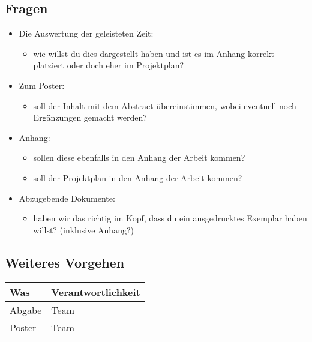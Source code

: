 \subsection*{Fragen}
\begin{itemize}
    \item Die Auswertung der geleisteten Zeit:
    \begin{itemize}
        \item wie willst du dies dargestellt haben und ist es im Anhang korrekt platziert oder doch eher im Projektplan?
    \end{itemize}
    \item Zum Poster: 
    \begin{itemize}
        \item soll der Inhalt mit dem Abstract übereinstimmen, wobei eventuell noch Ergänzungen gemacht werden?
    \end{itemize}
    \item Anhang: 
    \begin{itemize}
        \item sollen diese ebenfalls in den Anhang der Arbeit kommen?
        \item soll der Projektplan in den Anhang der Arbeit kommen?
    \end{itemize}
    \item Abzugebende Dokumente: 
    \begin{itemize}
        \item haben wir das richtig im Kopf, dass du ein ausgedrucktes Exemplar haben willst? (inklusive Anhang?)
    \end{itemize}
    
\end{itemize}

\vspace{1cm}

\subsection*{Weiteres Vorgehen}
\begin{table}[H]
    \centering
    \begin{tabular}{p{12cm} p{4cm}}
        \textbf{Was} & \textbf{Verantwortlichkeit} \\ \hline
        Abgabe & Team \\ \hline
        Poster & Team \\ \hline
    \end{tabular}
\end{table}

